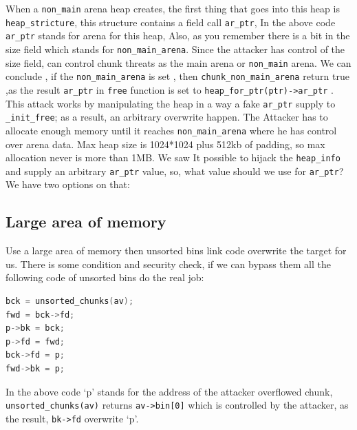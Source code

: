 \documentclass{masterthesis}
\newcommand*\ub{unsorted bins}
\newcommand*\freec{\lstinline{free}}
\begin{document}
When a \lstinline{non_main} arena heap creates, the first thing that goes into this heap is \lstinline{heap_stricture}, this structure contains a field call \lstinline{ar_ptr}, In the above code \lstinline{ar_ptr} stands for arena for this heap, Also, as you remember there is a bit in the size field which stands for \lstinline{non_main_arena}. Since the attacker has control of the size field, can control chunk threats as the main arena or \lstinline{non_main} arena. We can conclude , if the \lstinline{non_main_arena} is set , then \lstinline{chunk_non_main_arena} return true ,as the result \lstinline{ar_ptr} in \freec{} function is set to \lstinline{heap_for_ptr(ptr)->ar_ptr} .
This attack works by manipulating the heap in a way a fake \lstinline{ar_ptr} supply to \lstinline{_init_free}; as a result, an arbitrary overwrite happen. The Attacker has to allocate enough memory until it reaches \lstinline{non_main_arena} where he has control over arena data. Max heap size is 1024*1024 plus 512kb of padding, so max allocation never is more than 1MB.
We saw It possible to hijack the \lstinline{heap_info} and supply an arbitrary \lstinline{ar_ptr} value, so, what value should we use for \lstinline{ar_ptr}? We have two options on that:

\subsection{Large area of memory}
Use a large area of memory then \ub{} link code overwrite the target for us. There is some condition and security check, if we can bypass them all the following code of \ub{} do the real job:
\begin{lstlisting}[language=c,frame=tlrb]
bck = unsorted_chunks(av);
fwd = bck->fd;
p->bk = bck;
p->fd = fwd;
bck->fd = p;
fwd->bk = p;
\end{lstlisting}

In the above code ‘p’ stands for the address of the attacker overflowed chunk, \lstinline{unsorted_chunks(av)} returns \lstinline{av->bin[0]} which is controlled by the attacker, as the result, \lstinline{bk->fd} overwrite ‘p’.
\end{document}
